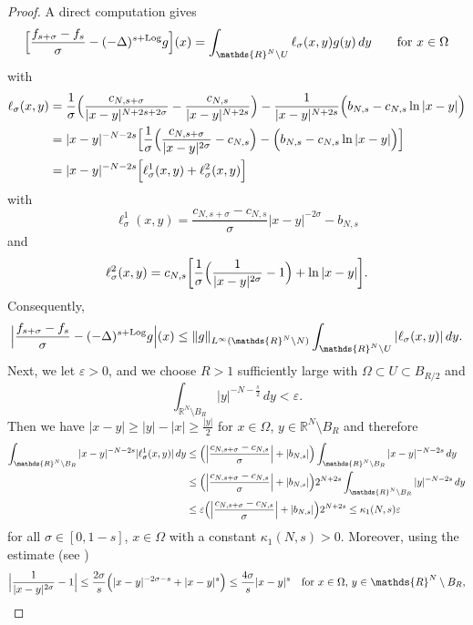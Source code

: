 \documentclass[notitlepage,11pt,reqno]{amsart}
\theoremstyle{definition}
\numberwithin{equation}{section}
\newcommand{\eps}{{\varepsilon}}
\newcommand{\R}{\mathds{R}}
\begin{document}
\begin{proof}
A direct computation gives
  $$
  \Bigl[\frac{f_{s+\sigma}-f_s}{\sigma}- (-\Delta)^{s+\mathrm{Log}} g \Bigr](x)= \int_{\R^N \setminus U}\ell_{\sigma}(x,y)g(y)\,dy\qquad \text{for $x \in \Omega$}
  $$
  with
  \begin{align*}
    \ell_{\sigma}(x,y) &= \frac{1}{\sigma}\Bigl(\frac{c_{N,s+\sigma}}{|x-y|^{N+2s+2\sigma}}-\frac{c_{N,s}}{|x-y|^{N+2s}}\Bigr)-  \frac{1}{|x-y|^{N+2s}}\Bigl(b_{N,s}- c_{N,s}\ln |x-y|\Bigr)\\
  &= |x-y|^{-N-2s}\Bigl[\frac{1}{\sigma}\Bigl(\frac{c_{N,s+\sigma}}{|x-y|^{2\sigma}}-c_{N,s}\Bigr)- \Bigl(b_{N,s}- c_{N,s}\ln |x-y|\Bigr)\Bigr]\\ 
    &= |x-y|^{-N-2s}\Bigl[\ell_\sigma^1(x,y)+ \ell_\sigma^2(x,y)\Bigr]
  \end{align*}
  with
  $$
  \ell_\sigma^1(x,y) = \frac{c_{N,s+\sigma}-c_{N,s}}{\sigma}|x-y|^{-2\sigma}- b_{N,s}
  $$
  and
  $$
  \ell_\sigma^2(x,y) = c_{N,s} \biggl[\frac{1}{\sigma}\Bigl(\frac{1}{|x-y|^{2\sigma}}-1\Bigr)+\ln |x-y|\biggr].
  $$
  Consequently,
  \begin{equation}
    \label{cks-g-l-infty-est}
  \Bigl|\frac{f_{s+\sigma}-f_s}{\sigma}- (-\Delta)^{s+\mathrm{Log}}g\Bigr|(x) \le \|g\|_{L^\infty(\R^N \setminus N)} \int_{\R^N \setminus U}|\ell_{\sigma}(x,y)|\,dy.
  \end{equation}
  Next, we let $\eps>0$, and we choose $R>1$ sufficiently large with $\Omega \subset U \subset B_{R/2}$ and
  $$
  \int_{\R^N \setminus B_R}|y|^{-N-\frac{s}{2}}\,dy < \eps.
  $$
  Then we have $|x-y| \ge |y|-|x| \ge \frac{|y|}{2}$ for $x \in \Omega$, $y \in \R^N \setminus B_R$ and therefore    
  \begin{align*}
    \int_{\R^N \setminus B_R}|x-y|^{-N-2s}|\ell^1_{\sigma}(x,y)|\,dy &\le \Bigl(\Bigl|\frac{c_{N,s+\sigma}-c_{N,s}}{\sigma}\Bigr|+|b_{N,s}|\Bigr) \int_{\R^N \setminus B_R}|x-y|^{-N-2s}\,dy\\
                                                                     &\le \Bigl(\Bigl|\frac{c_{N,s+\sigma}-c_{N,s}}{\sigma}\Bigr|+|b_{N,s}|\Bigr)2^{N+2s} \int_{\R^N \setminus B_R}|y|^{-N-2s}\,dy\\
        &\le \eps \Bigl(\Bigl|\frac{c_{N,s+\sigma}-c_{N,s}}{\sigma}\Bigr|+|b_{N,s}|\Bigr)2^{N+2s} \le \kappa_1(N,s)\eps
  \end{align*}
  for all $\sigma \in [0,1-s]$, $x \in \Omega$ with a constant $\kappa_1(N,s)>0$. Moreover, using the estimate  (see \cite[Lemma 2.1]{JSW20})
  $$
  \Bigl|\frac{1}{|x-y|^{2\sigma}}-1\Bigr| \le \frac{2 \sigma}{s}\Bigl(|x-y|^{-2\sigma-s}+ |x-y|^{s}\Bigr) \le \frac{4 \sigma}{s}|x-y|^{s} \quad \text{for $x \in \Omega$, $y \in \R^N \setminus B_R$,}  
$$
\end{proof}
\end{document}
